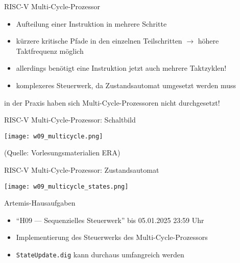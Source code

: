 \documentclass[
  german,            %
  aspectratio=169,    %
]{tumbeamer}
\begin{document}
\begin{frame}[c, fragile]{RISC-V Multi-Cycle-Prozessor}{}
	\begin{itemize}
		\item Aufteilung einer Instruktion in mehrere Schritte
		\item kürzere kritische Pfade in den einzelnen Teilschritten $\rightarrow$ höhere Taktfrequenz möglich
		\item allerdings benötigt eine Instruktion jetzt auch mehrere Taktzyklen!
		\item komplexeres Steuerwerk, da Zustandsautomat umgesetzt werden muss
	\end{itemize}
	\begin{center}
		in der Praxis haben sich Multi-Cycle-Prozessoren nicht durchgesetzt!
	\end{center}
\end{frame}

\begin{frame}[c]{RISC-V Multi-Cycle-Prozessor: Schaltbild}{}
	\begin{center}
		\texttt{[image: w09\_multicycle.png]}
	\end{center}
	\centering
	\tiny (Quelle: Vorlesungsmaterialien ERA)
\end{frame}

\begin{frame}[c]{RISC-V Multi-Cycle-Prozessor: Zustandsautomat}{}
	\begin{center}
		\texttt{[image: w09\_multicycle\_states.png]}
	\end{center}
	\centering
\end{frame}

\begin{frame}[c, fragile]{Artemis-Hausaufgaben}{}
	\begin{itemize}
		\item \enquote{H09 --- Sequenzielles Steuerwerk} bis 05.01.2025 23:59 Uhr
		\item Implementierung des Steuerwerks des Multi-Cycle-Prozessors
		\item \texttt{StateUpdate.dig} kann durchaus umfangreich werden
	\end{itemize}
\end{frame}
\end{document}

